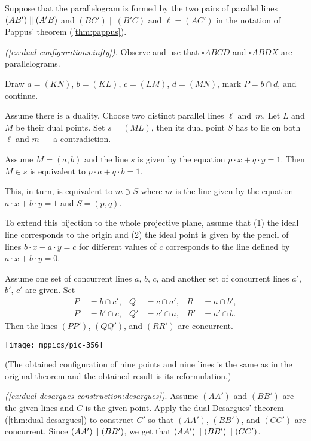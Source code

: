 Suppose that the parallelogram is formed by the two pairs of parallel lines $(AB')\parallel (A'B)$ and $(BC')\parallel(B'C)$ and $\ell=(AC')$ in the notation of Pappus' theorem (\ref{thm:pappus}).

\parbf{\ref{ex:dual-configurations};}
\textit{(\ref{ex:dual-configurations:infty}).} Observe and use that $\square ABCD$ and $\square ABDX$ are parallelograms.

Draw $a=(KN)$, $b=(KL)$, $c=(LM)$, $d=(MN)$, mark $P=b\cap d$, and continue. 

Assume there is a duality.
Choose two distinct parallel lines $\ell$ and~$m$.
Let $L$ and $M$ be their dual points.
Set $s=(ML)$, then its dual point $S$ has to lie on both $\ell$ and $m$ --- a contradiction.

Assume $M=(a,b)$ 
and the line $s$ is given by the equation $p\cdot x+q\cdot y=1$.
Then $M\in s$ is equivalent to $p\cdot a+q\cdot b=1$.

This, in turn, is equivalent to $m\ni S$
where $m$ is the line given by the equation 
$a\cdot x+b\cdot y=1$ and $S=(p,q)$.

To extend this bijection to the whole projective plane, assume that 
(1) the ideal line corresponds to the origin 
and (2) the ideal point is given by the pencil of lines $b\cdot x-a\cdot y=c$ for different values of $c$ corresponds to the line defined by $a\cdot x+b\cdot y=0$.

Assume one set of concurrent lines $a$, $b$, $c$, 
and another set of concurrent lines $a'$, $b'$, $c'$ are given.
Set 
\begin{align*}
P&=b\cap c',
&
Q&=c\cap a',
&
R&=a\cap b',\\
P'&=b'\cap c,
&
Q'&=c'\cap a,
&
R'&=a'\cap b.
\end{align*}
Then the lines $(PP')$, $(QQ')$, and $(RR')$ are concurrent.

\begin{Figure}
\vskip-0mm
\centering
\texttt{[image: mppics/pic-356]}
\vskip-0mm
\end{Figure}

(The obtained configuration of nine points and nine lines is the same as in the original theorem and the obtained result is its reformulation.)

\parbf{\ref{ex:dual-desargues-construction},} \textit{(\ref{ex:dual-desargues-construction:desargues})}.
Assume $(AA')$ and $(BB')$ are the given lines and $C$ is the given point.
Apply the dual Desargues' theorem (\ref{thm:dual-desargues}) to construct $C'$ so that $(AA')$, $(BB')$, and $(CC')$ are concurrent. 
Since $(AA')\parallel (BB')$, 
we get that 
$(AA')\parallel (BB')\parallel (CC')$.

